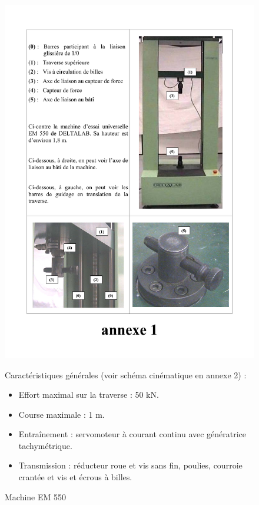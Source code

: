 \begin{figure}[htbp]
\begin{minipage}[c]{.40\linewidth}
\begin{center}
\includegraphics[width=\linewidth]{img/annexe1.pdf}
\caption{Machine EM 550}
\label{fig:image3}
\end{center}
\end{minipage}
\hfill
\begin{minipage}[c]{.55\linewidth}
Caractéristiques générales (voir schéma cinématique en annexe 2) :
\begin{itemize}
 \item Effort maximal sur la traverse : 50 kN.
 \item Course maximale : 1 m.
 \item Entraînement : servomoteur à courant continu avec génératrice tachymétrique.
 \item Transmission : réducteur roue et vis sans fin, poulies, courroie crantée et vis et écrous à billes.

\end{itemize}
\end{minipage}
\end{figure}
